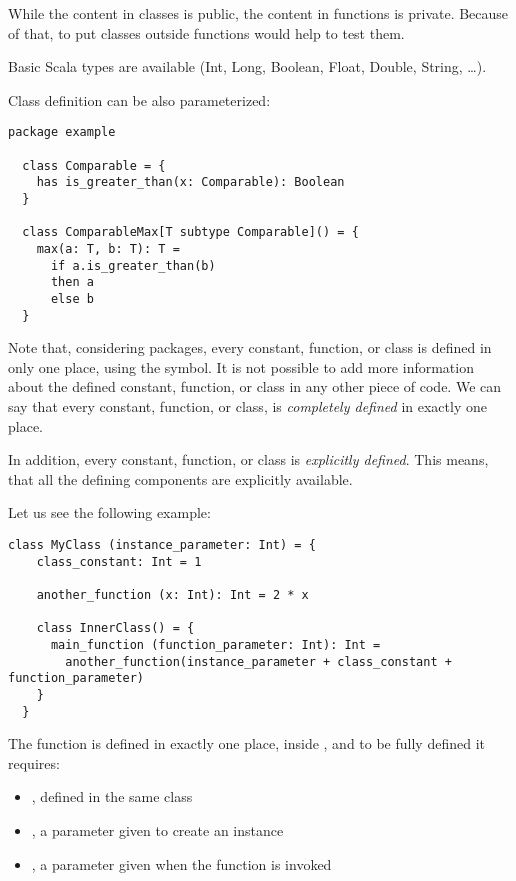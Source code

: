 While the content in classes is public, the content in functions is private.
Because of that, to put classes outside functions would help to test them.

Basic Scala types are available (Int, Long, Boolean, Float, Double, String, \ldots).

Class definition can be also parameterized:
\begin{lstlisting}[label={lst:exampleParameterizedClass}]
  package example

  class Comparable = {
    has is_greater_than(x: Comparable): Boolean
  }

  class ComparableMax[T subtype Comparable]() = {
    max(a: T, b: T): T =
      if a.is_greater_than(b)
      then a
      else b
  }
\end{lstlisting}

Note that, considering packages, every constant, function, or class is defined in only one place, using the \sodadef symbol.
It is not possible to add more information about the defined constant, function, or class in any other piece of code.
We can say that every constant, function, or class, is \emph{completely defined} in exactly one place.

In addition, every constant, function, or class is \emph{explicitly defined}.
This means, that all the defining components are explicitly available.

Let us see the following example:
\begin{lstlisting}[label={lst:exampleExplicitDefinition}]
  class MyClass (instance_parameter: Int) = {
    class_constant: Int = 1

    another_function (x: Int): Int = 2 * x

    class InnerClass() = {
      main_function (function_parameter: Int): Int =
        another_function(instance_parameter + class_constant + function_parameter)
    }
  }
\end{lstlisting}

The function  is defined in exactly one place, inside , and to be fully defined it requires:
\begin{itemize}
    \item {}, defined in the same class
    \item {}, a parameter given to create an instance
    \item {}, a parameter given when the function is invoked
\end{itemize}

